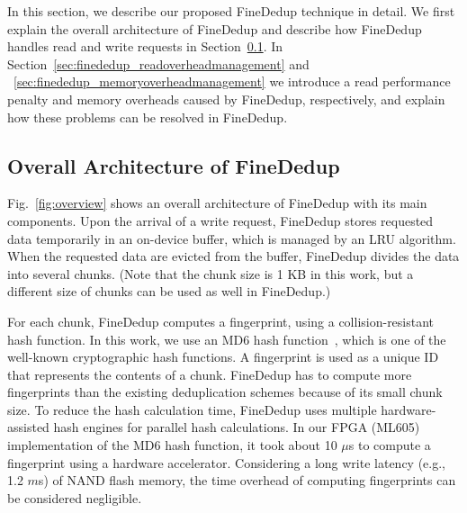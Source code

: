 In this section, we describe our proposed FineDedup technique in detail.
We first explain the overall architecture of FineDedup and 
describe how FineDedup handles read and write requests in Section~\ref{sec:finededup_architecture}.
In Section~\ref{sec:finededup_readoverheadmanagement} and ~\ref{sec:finededup_memoryoverheadmanagement}
we introduce a read performance penalty and memory overheads caused by FineDedup, respectively,
and explain how these problems can be resolved in FineDedup.

\subsection{Overall Architecture of FineDedup}
\label{sec:finededup_architecture}

Fig.~\ref{fig:overview} shows an overall architecture of FineDedup with its main components.
Upon the arrival of a write request,
FineDedup stores requested data temporarily in an on-device buffer,
which is managed by an LRU algorithm.
When the requested data are evicted from the buffer,
FineDedup divides the data into several chunks.
(Note that the chunk size is 1 KB in this work, 
but a different size of chunks can be used as well in FineDedup.)

For each chunk, FineDedup computes a fingerprint, using a collision-resistant hash function.
In this work, we use an MD6 hash function~\cite{md6}, which is one of the well-known cryptographic hash functions.
A fingerprint is used as a unique ID that represents the contents of a chunk.
FineDedup has to compute more fingerprints than the existing deduplication schemes
because of its small chunk size.
To reduce the hash calculation time,
FineDedup uses multiple hardware-assisted hash engines for parallel hash calculations. 
In our FPGA (ML605) implementation of the MD6 hash function, it took about 10 $\mu$s to compute a fingerprint using a hardware accelerator.
Considering a long write latency (e.g., 1.2 $m$s) of NAND flash memory,
the time overhead of computing fingerprints can be considered negligible.

